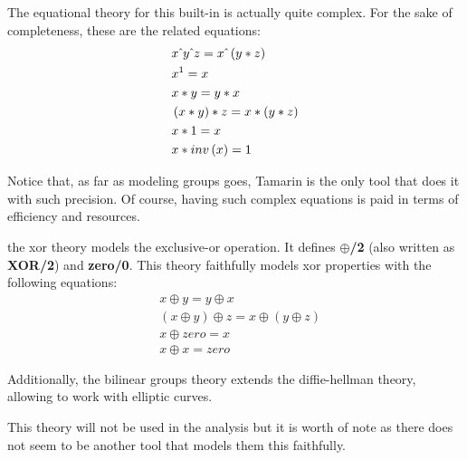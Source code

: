 \begin{description}[style=nextline]
        The equational theory for this built-in is actually quite complex. For the sake of completeness, these are the related equations:
        \begin{equation}
            \begin{aligned}
                 & x \hat{\mkern6mu} y \hat{\mkern6mu} z = x \hat{\mkern6mu} \left(y * z\right) \\
                 & x ^ 1 = x                                         \\
                 & x * y = y * x                                     \\
                 & \left(x * y\right) * z = x * \left(y * z\right)   \\
                 & x * 1 = x                                         \\
                 & x * inv\left(x\right) = 1
            \end{aligned}
        \end{equation}

        Notice that, as far as modeling groups goes, Tamarin is the only tool that does it with such precision. Of course, having such complex equations is paid in terms of efficiency and resources.
    \item[xor and bilinear-pairing] the xor theory models the exclusive-or operation. It defines \textbf{$\oplus$/2} (also written as \textbf{XOR/2}) and \textbf{zero/0}. This theory faithfully models xor properties with the following equations:
        \begin{equation}
            \begin{aligned}
                 & x \oplus y = y \oplus x                                             \\
                 & \left(x \oplus y\right) \oplus z = x \oplus \left(y \oplus z\right) \\
                 & x \oplus zero = x                                                   \\
                 & x \oplus x = zero
            \end{aligned}
        \end{equation}

        Additionally, the bilinear groups theory extends the diffie-hellman theory, allowing to work with elliptic curves.

        This theory will not be used in the analysis but it is worth of note as there does not seem to be another tool that models them this faithfully.
\end{description}

